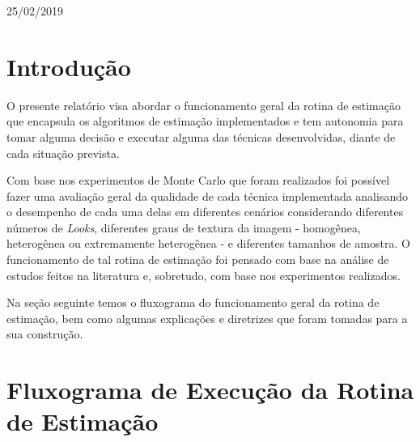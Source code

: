 \documentclass[11pt]{article}
\begin{document}
\begin{titlepage}

{\large 25/02/2019}\\[2cm] %


 

\vfill %

\end{titlepage}


\section{Introdução}
O presente relatório visa abordar o funcionamento geral da rotina de estimação que encapsula os algoritmos de estimação implementados e tem autonomia para tomar alguma decisão e executar alguma das técnicas desenvolvidas, diante de cada situação prevista. 

Com base nos experimentos de Monte Carlo que foram realizados foi possível fazer uma avaliação geral da qualidade de cada técnica implementada analisando o desempenho de cada uma delas em diferentes cenários considerando diferentes números de \textit{Looks}, diferentes graus de textura da imagem - homogênea, heterogênea ou extremamente heterogênea - e diferentes tamanhos de amostra. O funcionamento de tal rotina de estimação foi pensado com base na análise de estudos feitos na literatura e, sobretudo, com base nos experimentos realizados.

Na seção seguinte temos o fluxograma do funcionamento geral da rotina de estimação, bem como algumas explicações e diretrizes que foram tomadas para a sua construção. 

\section{Fluxograma de Execução da Rotina de Estimação}
\end{document}
